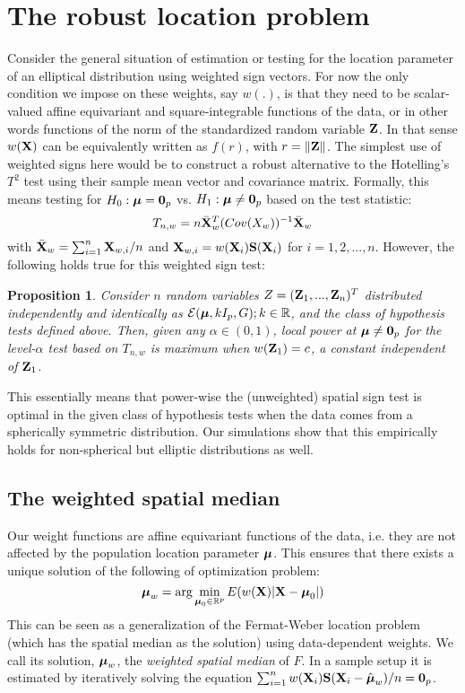 \documentclass[12pt,letterpaper]{article}
\newtheorem{Proposition}[Theorem]{Proposition}
\theoremstyle{definition} \newtheorem{Definition}[Theorem]{Definition}
\begin{document}
\section{The robust location problem}
Consider the general situation of estimation or testing for the location parameter of an elliptical distribution using weighted sign vectors. For now the only condition we impose on these weights, say $w(.)$, is that they need to be scalar-valued affine equivariant and square-integrable functions of the data, or in other words functions of the norm of the standardized random variable ${\mathbf{Z}}$. In that sense $w({\mathbf{X}})$ can be equivalently written as $f(r)$, with $r = \| {\mathbf{Z}} \|$. The simplest use of weighted signs here would be to construct a robust alternative to the Hotelling's $T^2$ test using their sample mean vector and covariance matrix. Formally, this means testing for $H_0: {\boldsymbol{\mu}} = {\bf 0}_p$ vs. $H_1:{\boldsymbol{\mu}} \neq {\bf 0}_p$  based on the test statistic:
%
$$ T_{n,w} = n \bar{{\mathbf{X}}}_w^T ( Cov (X_w))^{-1} \bar{{\mathbf{X}}}_w $$
%
with $\bar{{\mathbf{X}}}_w = \sum_{i=1}^n {\mathbf{X}}_{w,i}/n$ and ${\mathbf{X}}_{w,i} = w({\mathbf{X}}_i ) {\mathbf{S}} ({\mathbf{X}}_i)$ for $i=1,2,...,n$. However, the following holds true for this weighted sign test:
%
\begin{Proposition}\label{proposition:SignTest}
Consider $n$ random variables $Z = ({\mathbf{Z}}_1,...,{\mathbf{Z}}_n)^T$ distributed independently and identically as $\mathcal{E}( {\boldsymbol{\mu}}, kI_p, G); k \in \mathbb R$, and the class of hypothesis tests defined above. Then, given any $\alpha \in (0,1)$, local power at ${\boldsymbol{\mu}} \neq {\bf 0}_p$ for the level-$\alpha$ test  based on $T_{n,w}$ is maximum when $w({\mathbf{Z}}_1) = c$, a constant independent of ${\mathbf{Z}}_1$.
\end{Proposition}
%
\noindent This essentially means that power-wise the (unweighted) spatial sign test \citep{OjaBook10} is optimal in the given class of hypothesis tests when the data comes from a spherically symmetric distribution. Our simulations show that this empirically holds for non-spherical but elliptic distributions as well.

\subsection{The weighted spatial median} 

Our weight functions are affine equivariant functions of the data, i.e. they are not affected by the population location parameter ${\boldsymbol{\mu}}$. This ensures that there exists a unique solution of the following of optimization problem:
%
$$
{\boldsymbol{\mu}}_w = \text{arg}\min_{{\boldsymbol{\mu}}_0 \in \mathbb{R}^p} E ( w({\mathbf{X}}) | {\mathbf{X}} - {\boldsymbol{\mu}}_0 |)
$$
%
 This can be seen as a generalization of the Fermat-Weber location problem (which has the spatial median \citep{brown83, Chaudhuri96} as the solution) using data-dependent weights. We call its solution, ${\boldsymbol{\mu}}_w$, the \textit{weighted spatial median} of $F$. In a sample setup it is estimated by iteratively solving the equation $\sum_{i=1}^n w({\mathbf{X}}_i) {\mathbf{S}} ({\mathbf{X}}_i - \hat{{\boldsymbol{\mu}}}_w)/n = {\bf 0}_p$.
\end{document}
